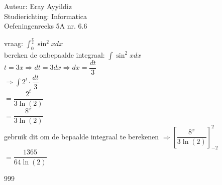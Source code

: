 \documentclass[a4paper]{article}
\begin{document}
  
\noindent \large Auteur: Eray Ayyildiz\\
\noindent \large Studierichting: Informatica\\
\noindent \large Oefeningenreeks 5A nr. 6.6\\

\medskip

\newcommand{\Bgtan}{\operatorname{Bgtan}}

\normalsize

vraag: $\displaystyle\int_{0}^{\tfrac{\pi}{2}} \sin^2x dx$\\

bereken de onbepaalde integraal: $ \displaystyle\int  \sin^2x dx$\\

$t = 3x \Rightarrow dt = 3dx \Rightarrow dx = \dfrac{dt}{3}$\\

$\Rightarrow \displaystyle\int 2^t \cdot \dfrac{dt}{3}$\\

$=  \dfrac{2^t}{3\ln(2)}$\\

$=  \dfrac{8^{x}}{3\ln(2)}$\\

gebruik dit om de bepaalde integraal te berekenen $\Rightarrow \left[\dfrac{8^{x}}{3\ln(2)}\right]_{-2}^{2}$\\

$= \dfrac{1365}{64\ln(2)}$\\

\begin{thebibliography}{999}
\end{thebibliography}
\end{document}

